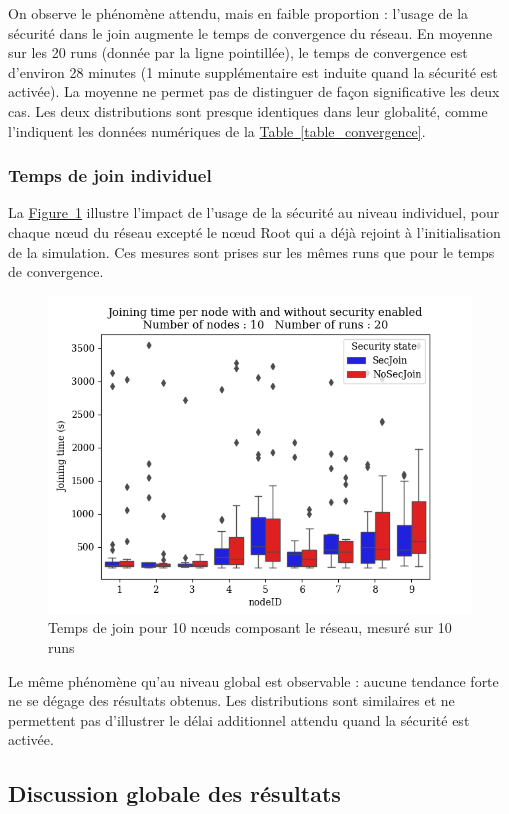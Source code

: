 \documentclass[]{report}
\newcommand{\wordlink}[2]{\hyperref[#2]{#1~\ref{#2}}}
\begin{document}
On observe le phénomène attendu, mais en faible proportion : l'usage de la sécurité dans le join augmente le temps de convergence du réseau. En moyenne sur les 20 runs (donnée par la ligne pointillée), le temps de convergence est d'environ 28 minutes (1 minute supplémentaire est induite quand la sécurité est activée). La moyenne ne permet pas de distinguer de façon significative les deux cas. Les deux distributions sont presque identiques dans leur globalité, comme l'indiquent les données numériques de la \wordlink{Table}{table_convergence}.


\subsubsection{Temps de join individuel}

La \wordlink{Figure}{fig:join_times} illustre l'impact de l'usage de la sécurité au niveau individuel, pour chaque nœud du réseau excepté le nœud Root qui a déjà rejoint à l'initialisation de la simulation. Ces mesures sont prises sur les mêmes runs que pour le temps de convergence. 

 \vspace{0.2cm}
	\begin{figure}[!h]
	\centering
	\includegraphics[width=0.7\linewidth]{results/secjoin/boxesJoiningTimePerNode20.png}
	\caption{Temps de join pour 10 nœuds composant le réseau, mesuré sur 10 runs}
	\label{fig:join_times}
	\end{figure}

Le même phénomène qu'au niveau global est observable : aucune tendance forte ne se dégage des résultats obtenus. Les distributions sont similaires et ne permettent pas d'illustrer le délai additionnel attendu quand la sécurité est activée.

\subsection{Discussion globale des résultats} 
\end{document}

